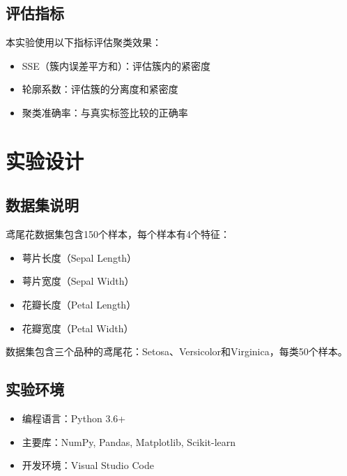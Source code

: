 \documentclass[12pt, a4paper]{article}
\begin{document}
\subsection{评估指标}
本实验使用以下指标评估聚类效果：
\begin{itemize}
    \item SSE（簇内误差平方和）：评估簇内的紧密度
    \item 轮廓系数：评估簇的分离度和紧密度
    \item 聚类准确率：与真实标签比较的正确率
\end{itemize}

\section{实验设计}
\subsection{数据集说明}
鸢尾花数据集包含150个样本，每个样本有4个特征：
\begin{itemize}
    \item 萼片长度（Sepal Length）
    \item 萼片宽度（Sepal Width）
    \item 花瓣长度（Petal Length）
    \item 花瓣宽度（Petal Width）
\end{itemize}

数据集包含三个品种的鸢尾花：Setosa、Versicolor和Virginica，每类50个样本。

\subsection{实验环境}
\begin{itemize}
    \item 编程语言：Python 3.6+
    \item 主要库：NumPy, Pandas, Matplotlib, Scikit-learn
    \item 开发环境：Visual Studio Code
\end{itemize}
\end{document}
